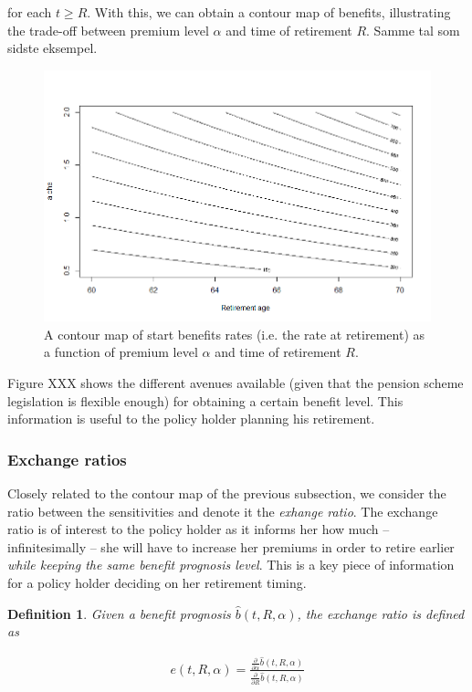 \documentclass{article}
\newcommand{\1}[1]{\mathbbm{1}_{\left\lbrace #1 \right\rbrace}}
\theoremstyle{break}
\newtheorem{definition}{Definition}[section]
\theoremstyle{remark}
\numberwithin{equation}{section}
\begin{document}
for each $t \geq R$. With this, we can obtain a contour map of benefits, illustrating the trade-off between premium level $\alpha$ and time of retirement $R$. Samme tal som sidste eksempel.

\begin{figure}[H] \label{ContourGraph}
	\centering
	\caption{A contour map of start benefits rates (i.e. the rate at retirement) as a function of premium level $\alpha$ and time of retirement $R$.}
	\includegraphics[width=\textwidth]{Contour}		
\end{figure}

Figure XXX shows the different avenues available (given that the pension scheme legislation is flexible enough) for obtaining a certain benefit level. This information is useful to the policy holder planning his retirement.

\subsubsection{Exchange ratios}

Closely related to the contour map of the previous subsection, we consider the ratio between the sensitivities and denote it the \textit{exhange ratio}. The exchange ratio is of interest to the policy holder as it informs her how much -- infinitesimally -- she will have to increase her premiums in order to retire earlier \textit{while keeping the same benefit prognosis level}. This is a key piece of information for a policy holder deciding on her retirement timing.

\begin{definition}
	Given a benefit prognosis $\hat{b}(t,R,\alpha)$, the exchange ratio is defined as
	
\begin{align*}
	e(t,R,\alpha) = \frac{\frac{\partial}{\partial \alpha }\hat{b}(t,R,\alpha)}{\frac{\partial}{\partial R }\hat{b}(t,R,\alpha)}
\end{align*}
\end{definition}
\end{document}
